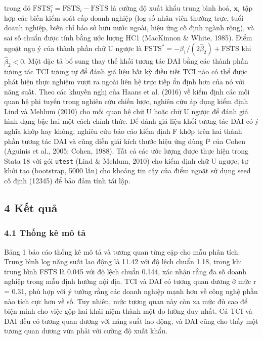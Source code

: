 \documentclass[12pt,a4paper]{article}
\begin{document}
trong đó
\(\mathrm{FSTS}^{c}_i = \mathrm{FSTS}_i - \overline{\mathrm{FSTS}}\) là
cường độ xuất khẩu trung bình hoá, \(\mathbf{x}_i\) tập hợp các biến
kiểm soát cấp doanh nghiệp (log số nhân viên thường trực, tuổi doanh
nghiệp, biến chỉ báo sở hữu nước ngoài, hiệu ứng cố định ngành rộng), và
sai số chuẩn được tính bằng ước lượng HC1 (MacKinnon \& White, 1985).
Điểm ngoặt ngụ ý của thành phần chữ U ngược là
\(\mathrm{FSTS}^{*} = -\hat{\beta}_1/(2\hat{\beta}_2) + \overline{\mathrm{FSTS}}\)
khi \(\hat{\beta}_2 < 0\). Một đặc tả bổ sung thay thế khối tương tác
DAI bằng các thành phần tương tác TCI tương tự để đánh giá liệu bất kỳ
điều tiết TCI nào có thể được phát hiện thực nghiệm vượt ra ngoài liên
hệ trực tiếp ổn định hơn của nó với năng suất. Theo các khuyến nghị của
Haans et al. (2016) về kiểm định các mối quan hệ phi tuyến trong nghiên
cứu chiến lược, nghiên cứu áp dụng kiểm định Lind và Mehlum (2010) cho
mối quan hệ chữ U hoặc chữ U ngược để đánh giá hình dạng bậc hai một
cách chính thức. Để đánh giá liệu khối tương tác DAI có ý nghĩa khớp hay
không, nghiên cứu báo cáo kiểm định F khớp trên hai thành phần tương tác
DAI và cũng diễn giải kích thước hiệu ứng dùng f² của Cohen (Aguinis et
al., 2005; Cohen, 1988). Tất cả các ước lượng được thực hiện trong Stata
18 với gói \texttt{utest} (Lind \& Mehlum, 2010) cho kiểm định chữ U
ngược; tự khởi tạo (bootstrap, 5000 lần) cho khoảng tin cậy của điểm
ngoặt sử dụng seed cố định (12345) để bảo đảm tính tái lập.

\hypertarget{4-kux1ebft-quux1ea3}{%
\subsection{4 Kết quả}\label{4-kux1ebft-quux1ea3}}

\hypertarget{41-thux1ed1ng-kuxea-muxf4-tux1ea3}{%
\subsubsection{4.1 Thống kê mô
tả}\label{41-thux1ed1ng-kuxea-muxf4-tux1ea3}}

Bảng 1 báo cáo thống kê mô tả và tương quan từng cặp cho mẫu phân tích.
Trung bình log năng suất lao động là 11.42 với độ lệch chuẩn 1.18, trong
khi trung bình FSTS là 0.045 với độ lệch chuẩn 0.144, xác nhận rằng đa
số doanh nghiệp trong mẫu định hướng nội địa. TCI và DAI có tương quan
dương ở mức r = 0.31, phù hợp với ý tưởng rằng các doanh nghiệp mạnh hơn
về công nghệ phần nào tích cực hơn về số. Tuy nhiên, mức tương quan này
còn xa mức đủ cao để biện minh cho việc gộp hai khái niệm thành một đo
lường duy nhất. Cả TCI và DAI đều có tương quan dương với năng suất lao
động, và DAI cũng cho thấy một tương quan dương vừa phải với cường độ
xuất khẩu.
\end{document}
